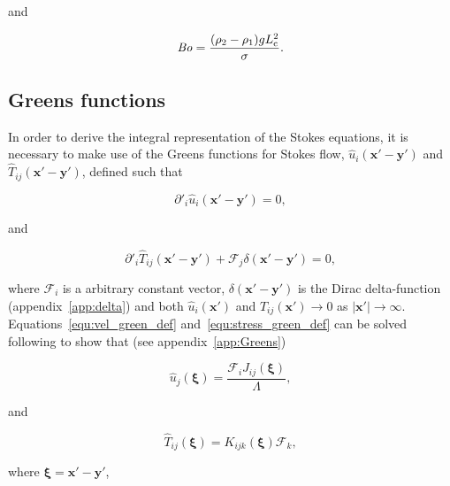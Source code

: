 \documentclass[12pt]{article}
\newcommand\Bo{\mbox{\textit{Bo}}}  %
\begin{document}
and

\begin{equation}
\label{equ:Bond}
\Bo = \frac{(\rho_{2} - \rho_{1}) g L_{\text{c}}^{2}}{\sigma}.
\end{equation}

\subsection{Greens functions}
\label{subsec:BIE_deriv}

In order to derive the integral representation of the Stokes equations, it is necessary to make use of the Greens functions \citep{Riley06} for Stokes flow, $\hat{u}_{i}(\boldsymbol{x'} - \boldsymbol{y'})$ and $\hat{T}_{ij}(\boldsymbol{x'} - \boldsymbol{y'})$, defined such that \citep{Kim05}

\begin{equation}
\label{equ:vel_green_def}
\partial'_{i} \hat{u}_{i}(\boldsymbol{x'} - \boldsymbol{y'}) = 0,
\end{equation}

and

\begin{equation}
\label{equ:stress_green_def}
\partial'_{i} \hat{T}_{ij}(\boldsymbol{x'} - \boldsymbol{y'}) + \mathcal{F}_{j} \delta(\boldsymbol{x'} - \boldsymbol{y'}) = 0 , 
\end{equation}

where $\mathcal{F}_{i}$ is a arbitrary constant vector, $\delta(\boldsymbol{x'} - \boldsymbol{y'})$ is the Dirac delta-function (appendix~\ref{app:delta}) and both $\hat{u}_{i}(\boldsymbol{x'})$ and $\hat{T}_{ij}(\boldsymbol{x'}) \to 0$ as $|\boldsymbol{x'}| \to \infty$. Equations~\ref{equ:vel_green_def} and~\ref{equ:stress_green_def} can be solved following \citet{Ladyzhenskaya63} to show that (see appendix~\ref{app:Greens}) \citep{Kim05}

\begin{equation}
\label{equ:vel_green}
\hat{u}_{j}(\boldsymbol{\xi}) = \frac{ \mathcal{F}_{i} J_{ij}(\boldsymbol{\xi})}{\Lambda} ,
\end{equation}

and 

\begin{equation}
\label{equ:stress_green}
\hat{T}_{ij}(\boldsymbol{\xi}) = K_{ijk}(\boldsymbol{\xi}) \mathcal{F}_{k} ,
\end{equation}

where $\boldsymbol{\xi} = \boldsymbol{x'} - \boldsymbol{y'}$,
\end{document}
